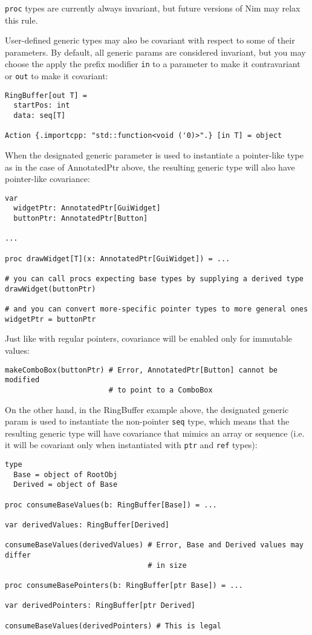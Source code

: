 \texttt{proc} types are currently always invariant, but future versions
of Nim may relax this rule.

User-defined generic types may also be covariant with respect to some of
their parameters. By default, all generic params are considered
invariant, but you may choose the apply the prefix modifier \texttt{in}
to a parameter to make it contravariant or \texttt{out} to make it
covariant:

\begin{verbatim}
RingBuffer[out T] =
  startPos: int
  data: seq[T]

Action {.importcpp: "std::function<void ('0)>".} [in T] = object
\end{verbatim}

When the designated generic parameter is used to instantiate a
pointer-like type as in the case of {AnnotatedPtr} above, the resulting
generic type will also have pointer-like covariance:

\begin{verbatim}
var
  widgetPtr: AnnotatedPtr[GuiWidget]
  buttonPtr: AnnotatedPtr[Button]

...

proc drawWidget[T](x: AnnotatedPtr[GuiWidget]) = ...

# you can call procs expecting base types by supplying a derived type
drawWidget(buttonPtr)

# and you can convert more-specific pointer types to more general ones
widgetPtr = buttonPtr
\end{verbatim}

Just like with regular pointers, covariance will be enabled only for
immutable values:

\begin{verbatim}
makeComboBox(buttonPtr) # Error, AnnotatedPtr[Button] cannot be modified
                        # to point to a ComboBox
\end{verbatim}

On the other hand, in the {RingBuffer} example above, the designated
generic param is used to instantiate the non-pointer \texttt{seq} type,
which means that the resulting generic type will have covariance that
mimics an array or sequence (i.e. it will be covariant only when
instantiated with \texttt{ptr} and \texttt{ref} types):

\begin{verbatim}
type
  Base = object of RootObj
  Derived = object of Base

proc consumeBaseValues(b: RingBuffer[Base]) = ...

var derivedValues: RingBuffer[Derived]

consumeBaseValues(derivedValues) # Error, Base and Derived values may differ
                                 # in size

proc consumeBasePointers(b: RingBuffer[ptr Base]) = ...

var derivedPointers: RingBuffer[ptr Derived]

consumeBaseValues(derivedPointers) # This is legal
\end{verbatim}

